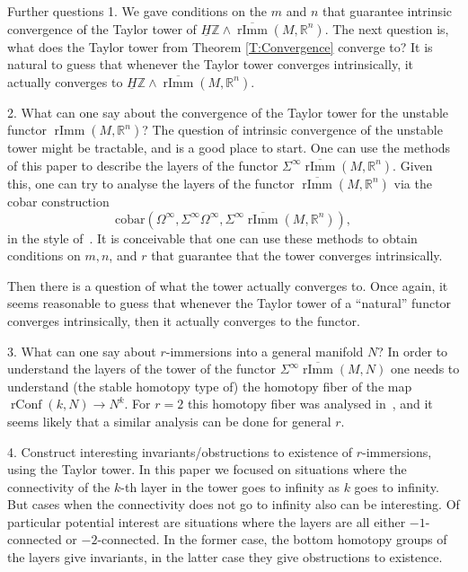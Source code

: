 \documentclass[12pt]{amsart}
\newcommand{\R}{{\mathbb R}}
\newcommand{\Z}{{\mathbb Z}}
\newcommand{\rImm}{\operatorname{rImm}}
\newcommand{\rbar}{\overline{\rImm}}
\newcommand{\rConf}{\operatorname{rConf}}
\newcommand{\HZ}{\underline{H}\Z}
\theoremstyle{plain}
\theoremstyle{definition}
\theoremstyle{remark}
\begin{document}
\vspace*{0.5cm}
\begin{section}{Further questions}\label{S:Further}
1. We gave conditions on the $m$ and $n$ that guarantee intrinsic convergence of the Taylor tower of $\HZ\wedge \rbar(M,\R^n)$. The next question is, what does the Taylor tower from Theorem \ref{T:Convergence} converge to? It is natural to guess that whenever the Taylor tower converges intrinsically, it actually converges to $\HZ\wedge \rbar(M,\R^n)$.

2. What can one say about the convergence of the Taylor tower for the unstable functor $\rImm(M,\R^n)$? The question of intrinsic convergence of the unstable tower might be tractable, and is a good place to start. One can use the methods of this paper to describe the layers of the functor $\Sigma^\infty \rbar(M, \R^n)$. Given this, one can try to analyse the layers of the functor $\rbar(M, \R^n)$ via the cobar construction \[\mathrm{cobar}(\Omega^\infty, \Sigma^\infty \Omega^\infty, \Sigma^\infty \rbar(M, \R^n)),\] in the style of~\cite{AC:OperadsChain}. It is conceivable that one can use these methods to obtain conditions on $m, n$, and $r$ that guarantee that the tower converges intrinsically.

Then there is a question of what the tower actually converges to. Once again, it seems reasonable to guess that whenever the Taylor tower of a ``natural'' functor converges intrinsically, then it actually converges to the functor.


3. What can one say about $r$-immersions into a general manifold $N$? In order to understand the layers of the tower of the functor $\Sigma^\infty \rbar(M, N)$ one needs to understand (the stable homotopy type of) the homotopy fiber of the map $\rConf(k, N)\to N^k$. For $r=2$ this homotopy fiber was analysed in~\cite{Arone:DerI}, and it seems likely that a similar analysis can be done for general $r$.

4. Construct interesting invariants/obstructions to existence of $r$-immersions, using the Taylor tower. In this paper we focused on situations where the connectivity of the $k$-th layer in the tower goes to infinity as $k$ goes to infinity. But cases when the connectivity does not go to infinity also can be interesting. Of particular potential interest are situations where the layers are all either $-1$-connected or $-2$-connected. In the former case, the bottom homotopy groups of the layers give invariants, in the latter case they give obstructions to existence.


\end{section}
\end{document}
